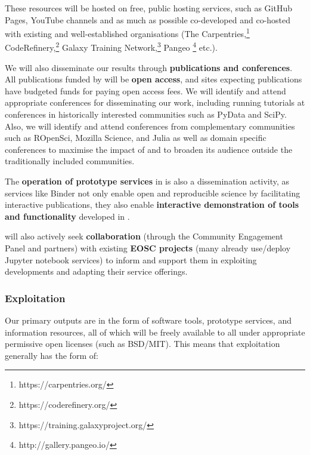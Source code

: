 These resources will be hosted on free, public hosting services,
such as GitHub Pages, YouTube channels and as much as possible co-developed and co-hosted with existing and
well-established organisations
(The Carpentries,\footnote{https://carpentries.org/} CodeRefinery,\footnote{https://coderefinery.org/}
Galaxy Training Network,\footnote{https://training.galaxyproject.org/} Pangeo \footnote{http://gallery.pangeo.io/} etc.).

We will also disseminate our results through \textbf{publications and conferences}.
All publications funded by \TheProject will be \textbf{open access},
and sites expecting publications have budgeted funds for paying open access fees.
We will identify and attend appropriate conferences for disseminating our work,
including running tutorials at conferences in historically interested communities such as PyData and SciPy.
Also, we will identify and attend conferences from complementary communities such as ROpenSci,
Mozilla Science, and Julia
as well as domain specific conferences to maximise the impact of \TheProject and to broaden its
audience outside the
traditionally included communities.

The \textbf{operation of prototype services} in  is also a dissemination activity,
as services like Binder not only enable open and reproducible science by facilitating interactive publications,
they also enable \textbf{interactive demonstration of tools and functionality}
developed in \TheProject.

\TheProject will also actively seek \textbf{collaboration} (through the Community
Engagement Panel and
\TheProject partners) with existing \textbf{EOSC projects} (many already use/deploy
Jupyter notebook services) to inform and support them in exploiting \TheProject
developments and adapting their service offerings.
\subsubsection{Exploitation}

Our primary outputs are in the form of software tools, prototype services, and information resources,
all of which will be freely available to all under appropriate permissive open
licenses (such as BSD/MIT).
This means that exploitation generally has the form of:

